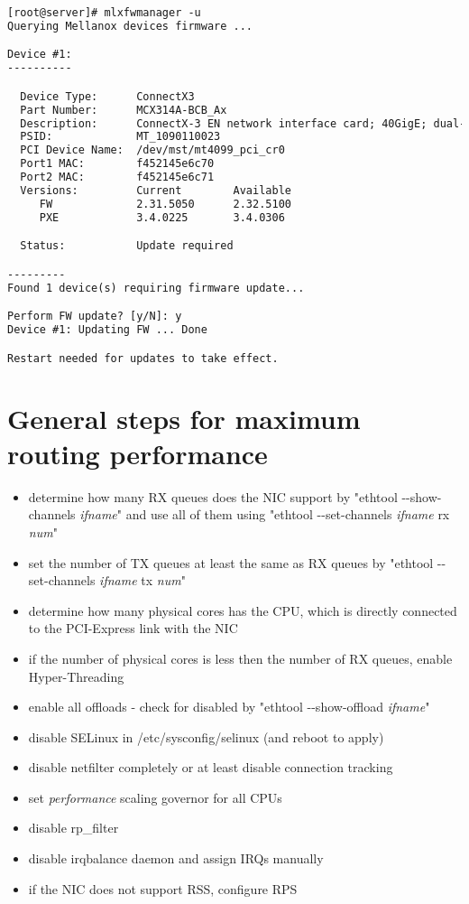 \begin{lstlisting}[language=TeX,label={lst:setup-firmware-update},caption={Firmware update procedure}]
[root@server]# mlxfwmanager -u
Querying Mellanox devices firmware ...

Device #1:
----------

  Device Type:      ConnectX3
  Part Number:      MCX314A-BCB_Ax
  Description:      ConnectX-3 EN network interface card; 40GigE; dual-port QSFP; PCIe3.0 x8 8GT/s; RoHS R6
  PSID:             MT_1090110023
  PCI Device Name:  /dev/mst/mt4099_pci_cr0
  Port1 MAC:        f452145e6c70
  Port2 MAC:        f452145e6c71
  Versions:         Current        Available     
     FW             2.31.5050      2.32.5100     
     PXE            3.4.0225       3.4.0306      

  Status:           Update required

---------
Found 1 device(s) requiring firmware update...

Perform FW update? [y/N]: y
Device #1: Updating FW ... Done

Restart needed for updates to take effect.
\end{lstlisting}

\chapter{General steps for maximum routing performance}\label{app:general-steps}
\begin{itemize}
\item determine how many RX queues does the NIC support by "ethtool -{}-show-channels {\it{ifname}}" and use all of them using
"ethtool -{}-set-channels {\it{ifname}} rx {\it{num}}"
\item set the number of TX queues at least the same as RX queues by "ethtool -{}-set-channels {\it{ifname}} tx {\it{num}}"
\item determine how many physical cores has the CPU, which is directly connected to the PCI-Express link with the NIC
\item if the number of physical cores is less then the number of RX queues, enable Hyper-Threading
\item enable all offloads - check for disabled by "ethtool -{}-show-offload {\it{ifname}}"
\item disable SELinux in /etc/sysconfig/selinux (and reboot to apply)
\item disable netfilter completely or at least disable connection tracking
\item set {\it{performance}} scaling governor for all CPUs
\item disable rp\_filter
\item disable irqbalance daemon and assign IRQs manually
\item if the NIC does not support RSS, configure RPS
\end{itemize}

